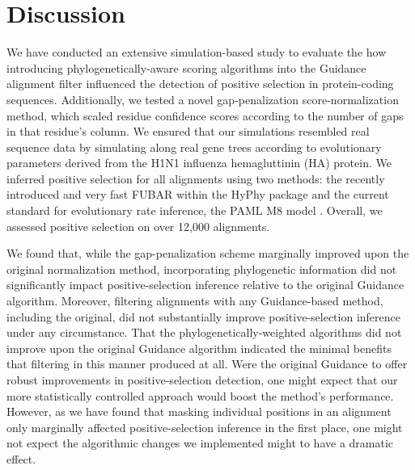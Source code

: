 \documentclass[10pt]{article}
\begin{document}



\section*{Discussion}

We have conducted an extensive simulation-based study to evaluate the how introducing phylogenetically-aware scoring algorithms into the Guidance alignment filter influenced the detection of positive selection in protein-coding sequences. Additionally, we tested a novel gap-penalization score-normalization method, which scaled residue confidence scores according to the number of gaps in that residue's column. We ensured that our simulations resembled real sequence data by simulating along real gene trees according to evolutionary parameters derived from the H1N1 influenza hemagluttinin (HA) protein. We inferred positive selection for all alignments using two methods: the recently introduced and very fast FUBAR \citep{Murrell2013} within the HyPhy package \citep{Pond2005} and the current standard for evolutionary rate inference, the PAML M8 model \citep{Yang2007}. Overall, we assessed positive selection on over 12,000 alignments.

We found that, while the gap-penalization scheme marginally improved upon the original normalization method, incorporating phylogenetic information did not significantly impact positive-selection inference relative to the original Guidance algorithm. Moreover, filtering alignments with any Guidance-based method, including the original, did not substantially improve positive-selection inference under any circumstance. That the phylogenetically-weighted algorithms did not improve upon the original Guidance algorithm indicated the minimal benefits that filtering in this manner produced at all. Were the original Guidance to offer robust improvements in positive-selection detection, one might expect that our more statistically controlled approach would boost the method's performance. However, as we have found that masking individual positions in an alignment only marginally affected positive-selection inference in the first place, one might not expect the algorithmic changes we implemented might to have a dramatic effect.
\end{document}
